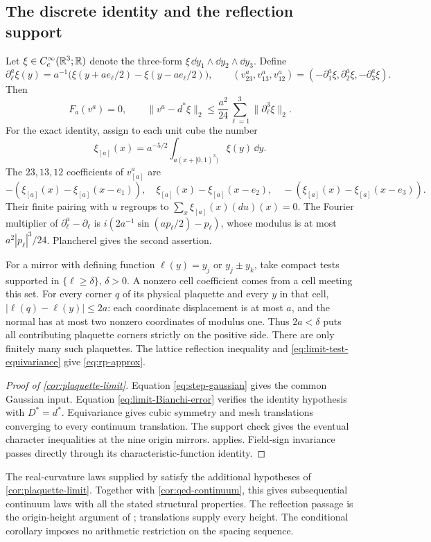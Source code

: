 \subsection{The discrete identity and the reflection support}
Let \(\xi\in C_c^\infty(\mathbb R^3;\mathbb R)\) denote the three-form
\(\xi\,\dd y_1\wedge\dd y_2\wedge\dd y_3\). Define
\[
 \partial_\ell^a\xi(y)
 =a^{-1}\bigl(\xi(y+ae_\ell/2)-\xi(y-ae_\ell/2)\bigr),\qquad
 (v^a_{23},v^a_{13},v^a_{12})
 =(-\partial_1^a\xi,\partial_2^a\xi,-\partial_3^a\xi).
\]
Then
\begin{equation}\label{eq:limit-Bianchi-error}
 F_a(v^a)=0,\qquad
 \|v^a-d^*\xi\|_2
 \le\frac{a^2}{24}\sum_{\ell=1}^3\|\partial_\ell^3\xi\|_2.
\end{equation}
For the exact identity, assign to each unit cube the number
\[
 \xi_{[a]}(x)=a^{-5/2}\int_{a(x+[0,1)^3)}\xi(y)\,\dd y.
\]
The \(23,13,12\) coefficients of \(v^a_{[a]}\) are
\[
 -(\xi_{[a]}(x)-\xi_{[a]}(x-e_1)),\quad
 \xi_{[a]}(x)-\xi_{[a]}(x-e_2),\quad
 -(\xi_{[a]}(x)-\xi_{[a]}(x-e_3)).
\]
Their finite pairing with \(u\) regroups to
\(\sum_x\xi_{[a]}(x)(du)(x)=0\).
The Fourier multiplier of
\(\partial_\ell^a-\partial_\ell\) is
\(i(2a^{-1}\sin(ap_\ell/2)-p_\ell)\), whose modulus is at most
\(a^2|p_\ell|^3/24\). Plancherel gives the second assertion.

For a mirror with defining function
\(\ell(y)=y_j\) or \(y_j\pm y_k\), take compact tests supported
in \(\{\ell\ge\delta\}\), \(\delta>0\).
A nonzero cell coefficient comes from a cell meeting this set.
For every corner \(q\) of its physical plaquette and every \(y\)
in that cell, \(|\ell(q)-\ell(y)|\le2a\):
each coordinate displacement is at most \(a\), and the normal
has at most two nonzero coordinates of modulus one.
Thus \(2a<\delta\) puts all contributing plaquette corners
strictly on the positive side. There are only finitely many such
plaquettes. The lattice reflection inequality and
\eqref{eq:limit-test-equivariance} give \eqref{eq:rp-approx}.

\begin{proof}[Proof of \cref{cor:plaquette-limit}]
Equation \eqref{eq:step-gaussian} gives the common Gaussian input.
Equation \eqref{eq:limit-Bianchi-error} verifies the identity
hypothesis with \(D^*=d^*\). Equivariance gives cubic symmetry and
mesh translations converging to every continuum translation.
The support check gives the eventual character inequalities at the
nine origin mirrors.  applies.
Field-sign invariance passes directly through its
characteristic-function identity.
\end{proof}

The real-curvature laws supplied by \cite[Theorem~A]{ChamberLattice}
satisfy the additional hypotheses of \cref{cor:plaquette-limit}.
Together with \cref{cor:qed-continuum}, this gives subsequential
continuum laws with all the stated structural properties. The
reflection passage is the origin-height argument of
\cite[Proposition~6.1]{QED3Manuscript}; translations supply every
height. The conditional corollary imposes no arithmetic restriction
on the spacing sequence.


